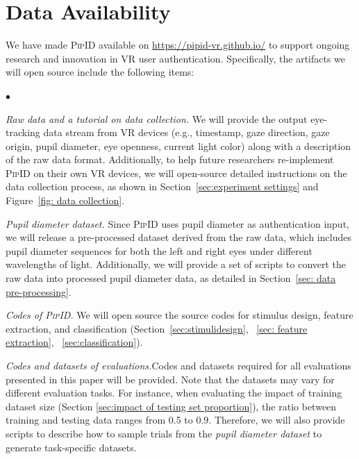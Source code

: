 \documentclass[sigconf]{acmart}
\newcommand{\sysname}{\textsc{PipID}\xspace}
\newenvironment{packeditemize}{
\begin{list}{$\bullet$}{
\setlength{\labelwidth}{8pt}
\setlength{\itemsep}{2pt}
\setlength{\leftmargin}{\labelwidth}
\addtolength{\leftmargin}{\labelsep}
\setlength{\parindent}{0pt}
\setlength{\listparindent}{\parindent}
\setlength{\parsep}{0pt}
\setlength{\topsep}{3pt}}}{\end{list}}
\begin{document}
\section{Data Availability}
\label{sec: appendix: data availability}
We have made \sysname available on \url{https://pipid-vr.github.io/} to support ongoing research and innovation in VR user authentication. Specifically, the artifacts we will open source include the following items:
\begin{packeditemize}
    \item \textit{Raw data and a tutorial on data collection.} We will provide the output eye-tracking data stream from VR devices (e.g., timestamp, gaze direction, gaze origin, pupil diameter, eye openness, current light color) along with a description of the raw data format. Additionally, to help future researchers re-implement \sysname on their own VR devices, we will open-source detailed instructions on the data collection process, as shown in Section~\ref{sec:experiment settings} and Figure~\ref{fig: data collection}.
    
    \item \textit{Pupil diameter dataset.} Since \sysname uses pupil diameter as authentication input, we will release a pre-processed dataset derived from the raw data, which includes pupil diameter sequences for both the left and right eyes under different wavelengths of light. Additionally, we will provide a set of scripts to convert the raw data into processed pupil diameter data, as detailed in Section~\ref{sec: data pre-processing}.
    
    \item \textit{Codes of \sysname.} We will open source the source codes for stimulus design, feature extraction, and classification (Section~\ref{sec:stimulidesign}, ~\ref{sec: feature extraction}, ~\ref{sec:classification}). 
    
    \item \textit{Codes and datasets of evaluations.}Codes and datasets required for all evaluations presented in this paper will be provided. Note that the datasets may vary for different evaluation tasks. For instance, when evaluating the impact of training dataset size (Section \ref{sec:impact of testing set proportion}), the ratio between training and testing data ranges from 0.5 to 0.9. Therefore, we will also provide scripts to describe how to sample trials from the \textit{pupil diameter dataset} to generate task-specific datasets. 

    
\end{packeditemize}
\end{document}
